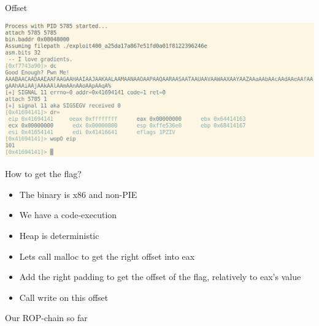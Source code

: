 \documentclass{beamer}
\begin{document}
\begin{frame}{Offset}
    \begin{center}
        \includegraphics[width=\textwidth]{exploit400_eip.png}
    \end{center}
\end{frame}

\begin{frame}{How to get the flag?}
    \begin{itemize}
        \item The binary is x86 and non-PIE
        \item We have a code-execution
        \item Heap is deterministic
        \item Lets call \alert{malloc} to get the right offset into \alert{eax}
        \item Add the right padding to get the offset of the flag, relatively to \alert{eax}'s value
        \item Call \alert{write} on this offset
    \end{itemize}
\end{frame}

\begin{frame}{Our ROP-chain so far}
\end{frame}
\end{document}
